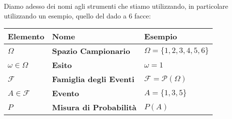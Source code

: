 \documentclass[11pt, a4paper, twoside]{article}
\begin{document}
Diamo adesso dei nomi agli strumenti che stiamo utilizzando, in particolare utilizzando un esempio, quello del dado a $6$ facce:

\begin{center}
	\begin{tabular}{|l|l|l|}
		\hline
		\textbf{Elemento} & \textbf{Nome} & \textbf{Esempio}\\
		\hline
		{$\Omega$} & \textbf{Spazio Campionario} & {$\Omega = \{1,2,3,4,5,6\}$}\\
		\hline
		{$\omega \in \Omega$} & \textbf{Esito} & {$\omega = 1$}\\
		\hline
		{$\mathcal F$} & \textbf{Famiglia degli Eventi} & {$\mathcal F = \mathcal P(\Omega)$}\\
		\hline\textbf{}
		{$A \in \mathcal F$} & \textbf{Evento} & {$A = \{1,3,5\}$}\\
		\hline
		{$P$} & \textbf{Misura di Probabilità} & {$P(A)$}\\
		\hline
	\end{tabular}
\end{center}
\end{document}
